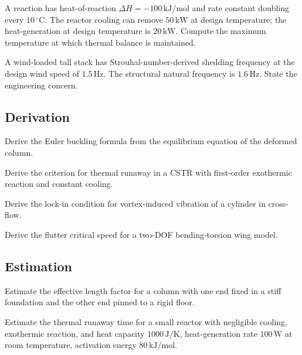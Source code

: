 \begin{exercise}
A reaction has heat-of-reaction $\Delta H = -100\,\text{kJ/mol}$ and rate constant doubling every $10\,^\circ\text{C}$. The reactor cooling can remove $50\,\text{kW}$ at design temperature; the heat-generation at design temperature is $20\,\text{kW}$. Compute the maximum temperature at which thermal balance is maintained.
\end{exercise}

\begin{exercise}
A wind-loaded tall stack has Strouhal-number-derived shedding frequency at the design wind speed of $1.5\,\text{Hz}$. The structural natural frequency is $1.6\,\text{Hz}$. State the engineering concern.
\end{exercise}

\subsection*{Derivation}

\begin{exercise}
Derive the Euler buckling formula from the equilibrium equation of the deformed column.
\end{exercise}

\begin{exercise}
Derive the criterion for thermal runaway in a CSTR with first-order exothermic reaction and constant cooling.
\end{exercise}

\begin{exercise}
Derive the lock-in condition for vortex-induced vibration of a cylinder in cross-flow.
\end{exercise}

\begin{exercise}
Derive the flutter critical speed for a two-DOF bending-torsion wing model.
\end{exercise}

\subsection*{Estimation}

\begin{exercise}
Estimate the effective length factor for a column with one end fixed in a stiff foundation and the other end pinned to a rigid floor.
\end{exercise}

\begin{exercise}
Estimate the thermal runaway time for a small reactor with negligible cooling, exothermic reaction, and heat capacity $1000\,\text{J/K}$, heat-generation rate $100\,\text{W}$ at room temperature, activation energy $80\,\text{kJ/mol}$.
\end{exercise}

